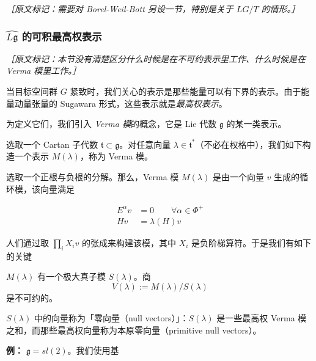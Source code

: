 {\small\itshape ［原文标记：需要对 Borel-Weil-Bott 另设一节，特别是关于 $LG/T$ 的情形。］}

\subsubsection{\texorpdfstring{$\widehat{L\mathfrak{g}}$}{Lg 带帽} 的可积最高权表示} %

{\small\itshape ［原文标记：本节没有清楚区分什么时候是在不可约表示里工作、什么时候是在 Verma 模里工作。］}

当目标空间群 $G$ 紧致时，我们关心的表示是那些能量可以有下界的表示。由于能量动量张量的 Sugawara 形式，这些表示就是\emph{最高权表示}。

为定义它们，我们引入 \emph{Verma 模}的概念，它是 Lie 代数 $\mathfrak{g}$ 的某一类表示。

选取一个 Cartan 子代数 $\mathfrak{t}\subset\mathfrak{g}$。对任意向量 $\lambda\in\mathfrak{t}^*$（不必在权格中），我们如下构造一个表示 $M(\lambda)$，称为 Verma 模。

选取一个正根与负根的分解。那么，Verma 模 $M(\lambda)$ 是由一个向量 $v$ 生成的循环模，该向量满足

\begin{equation}
  \begin{aligned}
    E^\alpha v &= 0\qquad \forall\alpha\in\Phi^+\\
    Hv &= \lambda(H)v
  \end{aligned}
  \tag{4.115}
  \label{eq:4.115}
\end{equation}

人们通过取 $\prod_i X_iv$ 的张成来构建该模，其中 $X_i$ 是负阶梯算符。于是我们有如下的关键

\begin{theorem}
  $M(\lambda)$ 有一个极大真子模 $S(\lambda)$。商
  \begin{equation}
    V(\lambda):=M(\lambda)/S(\lambda)
    \tag{4.116}
    \label{eq:4.116}
  \end{equation}
  是不可约的。
\end{theorem}

$S(\lambda)$ 中的向量称为「零向量（null vectors）」：$S(\lambda)$ 是一些最高权 Verma 模之和，而那些最高权向量称为本原零向量（primitive null vectors）。

\textbf{例：} $\mathfrak{g}=sl(2)$。我们使用基

